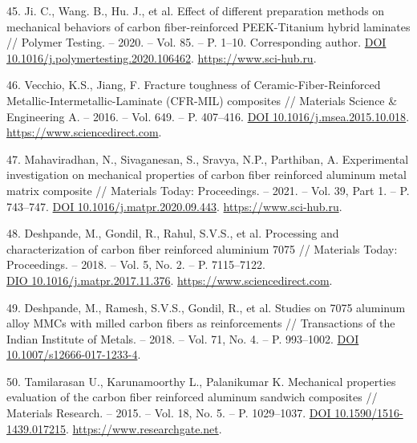 \begin{references}
45. Ji. C., Wang. B., Hu. J., et al. Effect of different preparation
methods on mechanical behaviors of carbon fiber-reinforced
PEEK-Titanium hybrid laminates // Polymer Testing. – 2020. –
Vol. 85. – P. 1–10. Corresponding
author. \href{https://doi.org/10.1016/j.polymertesting.2020.106462}{DOI 10.1016/j.polymertesting.2020.106462}. \href{https://www.sci-hub.ru/10.1016/j.polymertesting.2020.106462?ysclid=m839czkw50582004401}{https://www.sci-hub.ru}.

46. Vecchio, K.S., Jiang, F. Fracture toughness of
Ceramic-Fiber-Reinforced Metallic-Intermetallic-Lami\-nate (CFR-MIL)
composites // Materials Science \& Engineering A. – 2016. –
Vol. 649. –
P. 407–416. \href{https://doi.org/10.1016/j.msea.2015.10.018}{DOI 10.1016/j.msea.2015.10.018}. \href{https://www.sciencedirect.com/science/article/abs/pii/S0921509315304822?via\%3Dihub}{https://www.sciencedirect.com}.

47. Mahaviradhan, N., Sivaganesan, S., Sravya, N.P., Parthiban,
A. Experimental investigation on mechan\-ical properties of carbon fiber
reinforced aluminum metal matrix composite // Materials Today:
Proceed\-ings. – 2021. – Vol. 39, Part 1. –
P. 743–747. \href{https://doi.org/10.1016/j.matpr.2020.09.443}{DOI 10.1016/j.matpr.2020.09.443}. \href{https://www.sci-hub.ru/10.1016/j.matpr.2020.09.443?ysclid=m839ktt5c4169456263}{https://www.sci-hub.ru}.

48. Deshpande, M., Gondil, R., Rahul, S.V.S., et al. Processing and
characterization of carbon fiber reinfor\-ced aluminium 7075 //
Materials Today: Proceedings. – 2018. – Vol. 5, No. 2. –
P. 7115–7122. \\\href{https://doi.org/10.1016/j.matpr.2017.11.376}{DIO 10.1016/j.matpr.2017.11.376}. \href{https://www.sciencedirect.com/science/article/abs/pii/S2214785317326445?via\%3Dihub}{https://www.sciencedirect.com}.

49. Deshpande, M., Ramesh, S.V.S., Gondil, R., et al. Studies on 7075
aluminum alloy MMCs with milled carbon fibers as reinforcements //
Transactions of the Indian Institute of Metals. – 2018. – Vol. 71,
No. 4. –
P. 993–1002. \href{https://doi.org/10.1007/s12666-017-1233-4}{DOI 10.1007/s12666-017-1233-4}.

50. Tamilarasan U., Karunamoorthy L., Palanikumar K. Mechanical
properties evaluation of the carbon fiber reinforced aluminum sandwich
composites // Materials Research. – 2015. – Vol. 18, No. 5. –
P. 1029–1037. \href{https://doi.org/10.1590/1516-1439.017215}{DOI 10.1590/1516-1439.017215}. \href{https://www.researchgate.net/publication/283618484_Mechanical_Properties_Evaluation_of_the_Carbon_Fibre_Reinforced_Aluminium_Sandwich_Composites}{https://www.researchgate.net}.


\end{references}
